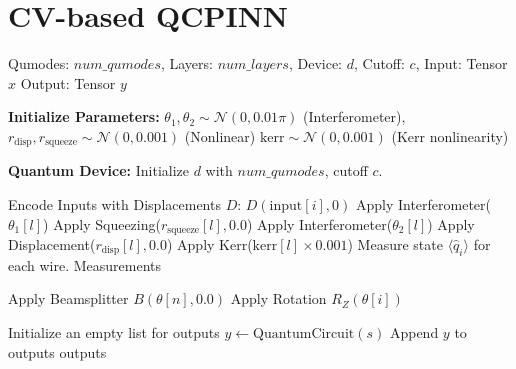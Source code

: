 
\section{CV-based QCPINN}
\label{app:appendix_a}

\begin{algorithm}[ht]
\footnotesize %
\caption{Continuous Variable Neural Network (CV-based QNN)}
\begin{algorithmic}[1]
\Require Qumodes: $num\_qumodes$, Layers: $num\_layers$, Device: $d$, Cutoff: $c$, Input: Tensor $x$
\Ensure Output: Tensor $y$

\State \textbf{Initialize Parameters:}
\State $\theta_1, \theta_2 \sim \mathcal{N}(0, 0.01\pi)$ (Interferometer), $r_{\text{disp}}, r_{\text{squeeze}} \sim \mathcal{N}(0, 0.001)$ (Nonlinear)
\State $\text{kerr} \sim \mathcal{N}(0, 0.001)$ (Kerr nonlinearity)

\State \textbf{Quantum Device:} Initialize $d$ with $num\_qumodes$, cutoff $c$.

        \State Encode Inputs with Displacements $D$: $D(\text{input}[i], 0)$ 
    \EndFor
        \State Apply Interferometer($\theta_1[l]$)
        \State Apply Squeezing($r_{\text{squeeze}}[l], 0.0$)
        \State Apply Interferometer($\theta_2[l]$)
        \State Apply Displacement($r_{\text{disp}}[l], 0.0$)
        \State Apply Kerr($\text{kerr}[l] \times 0.001$)
    \EndFor
    \State Measure state $\langle \hat{q}_i \rangle$ for each wire.
    \State \Return Measurements
\EndProcedure

                \State Apply Beamsplitter $B(\theta[n], 0.0)$
            \EndIf
        \EndFor
    \EndFor
        \State Apply Rotation $R_Z(\theta[i])$
    \EndFor
\EndProcedure

    \State Initialize an empty list for outputs
        \State $y \gets \text{QuantumCircuit}(s)$
        \State Append $y$ to outputs
    \EndFor
    \State \Return outputs
\EndProcedure

\end{algorithmic}
\label{alg:cv_qnn}
\end{algorithm}



